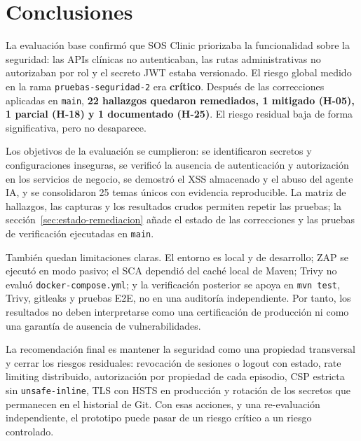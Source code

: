 \section{Conclusiones}
\label{sec:conclusiones}

La evaluación base confirmó que SOS Clinic priorizaba la funcionalidad sobre la
seguridad: las APIs clínicas no autenticaban, las rutas administrativas no
autorizaban por rol y el secreto JWT estaba versionado. El riesgo global medido en
la rama \texttt{pruebas-seguridad-2} era \textbf{crítico}. Después de las
correcciones aplicadas en \texttt{main}, \textbf{22 hallazgos quedaron remediados,
1 mitigado (H-05), 1 parcial (H-18) y 1 documentado (H-25)}. El riesgo residual baja
de forma significativa, pero no desaparece.

Los objetivos de la evaluación se cumplieron: se identificaron secretos y
configuraciones inseguras, se verificó la ausencia de autenticación y autorización
en los servicios de negocio, se demostró el XSS almacenado y el abuso del agente
IA, y se consolidaron 25 temas únicos con evidencia reproducible. La matriz de
hallazgos, las capturas y los resultados crudos permiten repetir las pruebas; la
sección~\ref{sec:estado-remediacion} añade el estado de las correcciones y las
pruebas de verificación ejecutadas en \texttt{main}.

También quedan limitaciones claras. El entorno es local y de desarrollo; ZAP se
ejecutó en modo pasivo; el SCA dependió del caché local de Maven; Trivy no evaluó
\texttt{docker-compose.yml}; y la verificación posterior se apoya en \texttt{mvn
test}, Trivy, gitleaks y pruebas E2E, no en una auditoría independiente. Por tanto,
los resultados no deben interpretarse como una certificación de producción ni como
una garantía de ausencia de vulnerabilidades.

La recomendación final es mantener la seguridad como una propiedad transversal y
cerrar los riesgos residuales: revocación de sesiones o logout con estado, rate
limiting distribuido, autorización por propiedad de cada episodio, CSP estricta sin
\texttt{unsafe-inline}, TLS con HSTS en producción y rotación de los secretos que
permanecen en el historial de Git. Con esas acciones, y una re-evaluación
independiente, el prototipo puede pasar de un riesgo crítico a un riesgo controlado.

